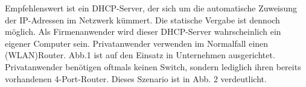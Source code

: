 \documentclass[a4paper,14pt,headsepline]{scrartcl}
\begin{document}
\begin{figure}[h]
\begin{center}
\end{center}
\end{figure}

\newpage

Empfehlenswert ist ein DHCP-Server, der sich um die automatische Zuweisung der IP-Adressen im Netzwerk kümmert. Die statische Vergabe ist dennoch möglich. Als Firmenanwender wird dieser DHCP-Server wahrscheinlich ein eigener Computer sein. Privatanwender verwenden im Normalfall einen \linebreak (WLAN)Router. Abb.1 ist auf den Einsatz in Unternehmen ausgerichtet. Privatanwender benötigen oftmals keinen Switch, sondern lediglich ihren bereits vorhandenen 4-Port-Router. Dieses Szenario ist in Abb. 2 verdeutlicht. 
\end{document}
